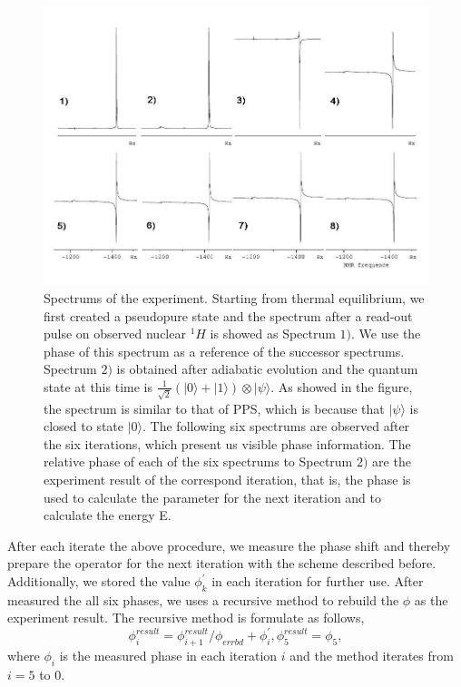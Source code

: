 \documentclass[twocolumn,showpacs,twoside,10pt,superscriptaddress,prl]{revtex4}
\begin{document}
\begin{figure}[htb]
\begin{center}
\includegraphics[width=0.99\columnwidth]{newspectrum}
\end{center}
\caption{Spectrums of the experiment. Starting from thermal
equilibrium, we first created a pseudopure state and the spectrum
after a read-out pulse on observed nuclear $^{1}H$ is showed as
Spectrum $1)$. We use the phase of this spectrum as a reference of
the successor spectrums. Spectrum $2)$ is obtained after adiabatic
evolution and the quantum state at this time is
$\frac{1}{\sqrt{2}}(|0\rangle+|1\rangle)\otimes|\psi\rangle$. As
showed in the figure, the spectrum is similar to that of PPS, which
is because that $|\psi\rangle$ is closed to state $|0\rangle$. The
following six spectrums are observed after the six iterations, which
present us visible phase information. The relative phase of each of
the six spectrums to Spectrum $2)$ are the experiment result of the
correspond iteration, that is, the phase is used to calculate the
parameter for the next iteration and to calculate the energy E.}
\label{newspectrum}
\end{figure}




After each iterate the above procedure, we measure the phase shift
and thereby prepare the operator for the next iteration with the
scheme described before. Additionally, we stored the value
$\phi^{'}_k$ in each iteration for further use. After measured the
all six phases, we uses a recursive method to rebuild the $\phi$ as
the experiment result. The recursive method is formulate as follows,
$$
\phi^{result}_i=\phi^{result}_{i+1} / \phi_{errbd} + \phi^{'}_i,
\phi^{result}_5 = \phi_5,
$$
where $\phi_i$ is the measured phase in each iteration $i$ and the
method iterates from $i=5$ to $0$.
\end{document}
